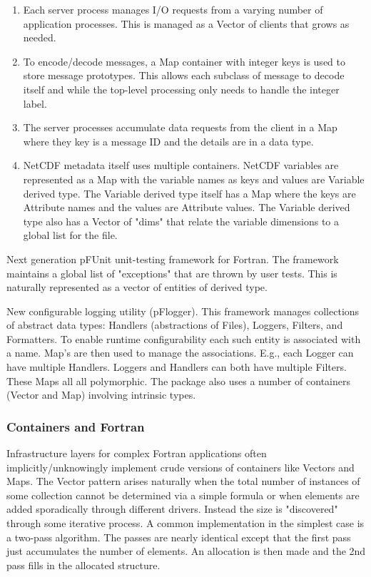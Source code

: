 \documentclass{article}
\begin{document}
\begin{enumerate}
\item Each server process manages I/O requests from a varying      number of application processes.  This is managed as a Vector of      clients that grows as needed.

\item To encode/decode messages, a Map container with integer keys is       used to store message prototypes.  This allows each subclass of       message to decode itself and while the top-level processing       only needs to handle the integer label.

\item The server processes accumulate data requests from the client        in a Map where they key is a message ID and the details are in        a data type.

\item NetCDF metadata itself uses multiple containers.  NetCDF       variables are represented as a Map with the variable names as       keys and values are Variable derived type.  The Variable
       derived type itself has a Map where the keys are Attribute       names and the values are Attribute values.  The Variable       derived type also has a Vector of "dims" that relate the
       variable dimensions to a global list for the file.
\end{enumerate}

 Next generation pFUnit unit-testing framework for Fortran.  The  framework maintains a global list of "exceptions" that are thrown by user tests.  This is naturally represented as a vector of entities of derived type.

 New configurable logging utility (pFlogger).  This framework   manages collections of abstract data types: Handlers (abstractions   of Files), Loggers, Filters, and Formatters.  To enable runtime
   configurability each such entity is associated with a name.  Map's   are then used to manage the associations.  E.g., each Logger can   have multiple Handlers.  Loggers and Handlers can both have
   multiple Filters.  These Maps all all polymorphic.  The package   also uses a number of containers (Vector and Map) involving   intrinsic types.

\subsubsection{Containers and Fortran}

Infrastructure layers for complex Fortran applications often
implicitly/unknowingly implement crude versions of containers like
Vectors and Maps.  The Vector pattern arises naturally
when the total number of instances of some collection cannot be
determined via a simple formula or when elements are added
sporadically through different drivers.  Instead the size is
"discovered" through some iterative process.  A common implementation
in the simplest case is a two-pass algorithm.  The passes are nearly
identical except that the first pass just accumulates the number of
elements.  An allocation is then made and the 2nd pass fills in the
allocated structure.
\end{document}
